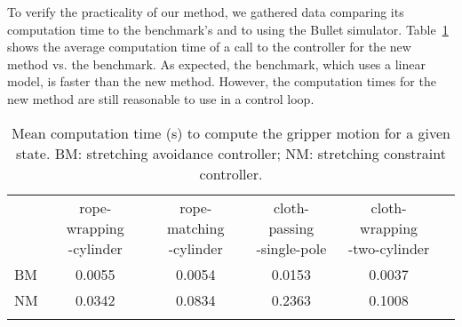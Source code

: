 To verify the practicality of our method, we gathered data comparing its computation time to the benchmark's and to using the Bullet simulator. Table~\ref{tbl:constraint_controller_time_report} shows the average computation time of a call to the controller for the new method vs. the benchmark. As expected, the benchmark, which uses a linear model, is faster than the new method. However, the computation times for the new method are still reasonable to use in a control loop.

\begin{table}[h]
\centering
\caption{Mean computation time (s) to compute the gripper motion for a given state. BM: stretching avoidance controller; NM: stretching constraint controller.}
\begin{tabular}{lccccc}
\hline\noalign{\smallskip}
        & \makecell{rope-wrapping\\-cylinder} 
        & \makecell{rope-matching\\-cylinder}
        & \makecell{cloth-passing\\-single-pole}
        & \makecell{cloth-wrapping\\-two-cylinder} \\
\noalign{\smallskip}\hline\noalign{\smallskip}
BM      & 0.0055   & 0.0054  & 0.0153  & 0.0037 \\
NM      & 0.0342   & 0.0834  & 0.2363  & 0.1008 \\
\noalign{\smallskip}\hline
\end{tabular}
\label{tbl:constraint_controller_time_report}
\end{table}